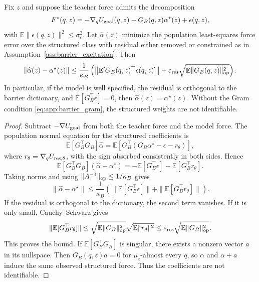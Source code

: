 \begin{proposition}
\label{prop:local_identifiability}
Fix $z$ and suppose the teacher force admits the decomposition
\begin{equation}
    F^\star(q,z)
    =
    -\nabla_q U_{\rm goal}(q,z)
    -G_B(q,z)\alpha^\star(z)
    +\epsilon(q,z),
    \label{eq:app:teacher_force_decomp}
\end{equation}
with $\mathbb E\|\epsilon(q,z)\|^2\le \sigma_\epsilon^2$. Let
$\widehat\alpha(z)$ minimize the population least-squares force error over the
structured class with residual either removed or constrained as in
Assumption~\ref{ass:barrier_excitation}. Then
\begin{equation}
    \|\widehat\alpha(z)-\alpha^\star(z)\|
    \le
    \frac{1}{\kappa_B}
    \left(
    \left\|
    \mathbb E[G_B(q,z)^\top\epsilon(q,z)]
    \right\|
    +
    \varepsilon_{\rm res}
    \sqrt{\mathbb E\|G_B(q,z)\|_{\rm op}^2}
    \right).
    \label{eq:app:alpha_identifiability_bound}
\end{equation}
In particular, if the model is well specified, the residual is orthogonal to the
barrier dictionary, and $\mathbb E[G_B^\top\epsilon]=0$, then
$\widehat\alpha(z)=\alpha^\star(z)$. Without the Gram condition
\eqref{eq:app:barrier_gram}, the structured weights are not identifiable.
\end{proposition}

\begin{proof}
Subtract $-\nabla U_{\rm goal}$ from both the teacher force and the model force. The
population normal equation for the structured coefficients is
\[
    \mathbb E[G_B^\top G_B]\widehat\alpha
    =
    \mathbb E[G_B^\top(G_B\alpha^\star-\epsilon-r_\theta)],
\]
where $r_\theta=\nabla_qU_{{\rm res},\theta}$, with the sign absorbed consistently in
both sides. Hence
\[
    \mathbb E[G_B^\top G_B](\widehat\alpha-\alpha^\star)
    =
    -\mathbb E[G_B^\top\epsilon]-\mathbb E[G_B^\top r_\theta].
\]
Taking norms and using
$\|A^{-1}\|_{\rm op}\le 1/\kappa_B$ gives
\[
    \|\widehat\alpha-\alpha^\star\|
    \le
    \frac{1}{\kappa_B}
    \left(
    \|\mathbb E[G_B^\top\epsilon]\|
    +
    \|\mathbb E[G_B^\top r_\theta]\|
    \right).
\]
If the residual is orthogonal to the dictionary, the second term vanishes. If it is only
small, Cauchy--Schwarz gives
\[
    \|\mathbb E[G_B^\top r_\theta]\|
    \le
    \sqrt{\mathbb E\|G_B\|_{\rm op}^2}
    \sqrt{\mathbb E\|r_\theta\|^2}
    \le
    \varepsilon_{\rm res}
    \sqrt{\mathbb E\|G_B\|_{\rm op}^2}.
\]
This proves the bound. If $\mathbb E[G_B^\top G_B]$ is singular, there exists a
nonzero vector $a$ in its nullspace. Then
$G_B(q,z)a=0$ for $\mu_z$-almost every $q$, so $\alpha$ and $\alpha+a$ induce the
same observed structured force. Thus the coefficients are not identifiable.
\end{proof}

